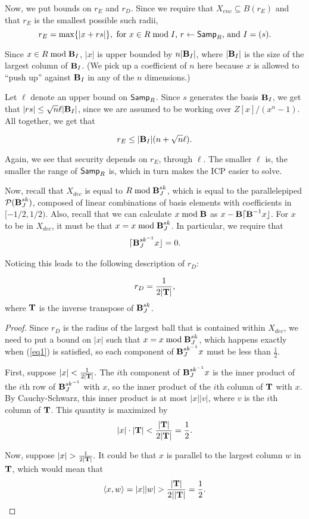 Now, we put bounds on $r_E$ and $r_D$. Since we require that $X_{enc} \subseteq B(r_E)$ and that $r_E$ is the smallest possible such radii,
\[r_E = \max\{|x + rs|\}, \text{ for $x \in R \bmod I$, $r \leftarrow {\sf Samp}_R$, and $I = (s)$}.\]


Since $x \in R \bmod \textbf{B}_I$, $|x|$ is upper bounded by $n |\textbf{B}_I|$, where $|\textbf{B}_I|$ is the size of the largest column of $\textbf{B}_I$. (We pick up a coefficient of $n$ here because $x$ is allowed to ``push up'' against $\textbf{B}_I$ in any of the $n$ dimensions.)

Let $\ell$ denote an upper bound on ${\sf Samp}_R$. Since $s$ generates the basis $\textbf{B}_I$, we get that $|rs| \leq \sqrt{n} \ell |\textbf{B}_I|$, since we are assumed to be working over $Z[x] / (x^n - 1)$. All together, we get that
\begin{lemma}
\[r_E \leq |\textbf{B}_I| (n + \sqrt{n} \ell).\]
\end{lemma}

Again, we see that security depends on $r_E$, through $\ell$. The smaller $\ell$ is, the smaller the range of ${\sf Samp}_R$ is, which in turn makes the ICP easier to solve.

Now, recall that $X_{dec}$ is equal to $R \bmod \textbf{B}_J^{sk}$, which is equal to the parallelepiped $\mathcal{P}(\textbf{B}_J^{sk})$, composed of linear combinations of basis elements with coefficients in $[-1/2, 1/2)$. Also, recall that we can calculate $x \bmod \textbf{B}$ as $x -  \textbf{B} \lceil \textbf{B} ^{-1} x \rfloor$. For $x$ to be in $X_{dec}$, it must be that $x = x \bmod \textbf{B}_J^{sk}$. In particular, we require that
\begin{align}
\lceil \textbf{B}_J^{sk ^{-1}} x \rfloor = 0. \label{eq1}
\end{align}

Noticing this leads to the following description of $r_D$:
\begin{lemma}
\[r_D = \frac{1}{2 |{\bf T}|},\]
where ${\bf T}$ is the inverse transpose of $\textbf{B}_J^{sk}$.
\end{lemma}
\begin{proof}
Since $r_D$ is the radius of the largest ball that is contained within $X_{dec}$, we need to put a bound on $|x|$ such that $x = x \bmod \textbf{B}_J^{sk}$, which happens exactly when (\ref{eq1}) is satisfied, so each component of $\textbf{B}_J^{sk ^{-1}} x$ must be less than $\frac{1}{2}$.

First, suppose $|x| < \frac{1}{2 |{\bf T}|}.$ The $i$th component of $\textbf{B}_J^{sk ^{-1}} x$ is the inner product of the $i$th row of $\textbf{B}_J^{sk ^{-1}}$ with $x$, so the inner product of the $i$th column of ${\bf T}$ with $x$. By Cauchy-Schwarz, this inner product is at most $|x| |v|$, where $v$ is the $i$th column of ${\bf T}$. This quantity is maximized by
\[|x| \cdot |{\bf T}| < \frac{|{\bf T}|}{2 |{\bf T}|} = \frac{1}{2}.\]

Now, suppose $|x| > \frac{1}{2 |{\bf T}|}.$ It could be that $x$ is parallel to the largest column $w$ in ${\bf T}$, which would mean that
\[\langle x, w \rangle = |x| |w| > \frac{|{\bf T}|}{2 ||{\bf T}|} = \frac{1}{2}.\]
\end{proof}

